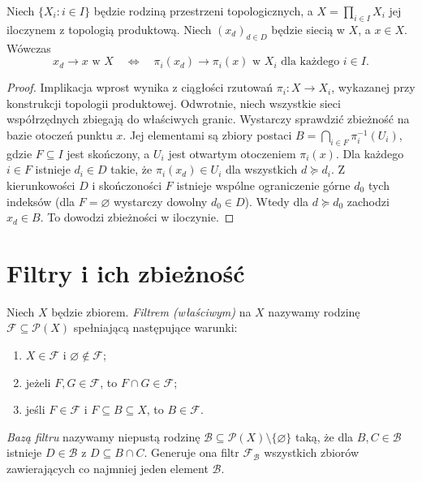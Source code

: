 \begin{twierdzenie}
\label{thm:topog-siec-iloczyn}
Niech $\{X_i:i\in I\}$ będzie rodziną przestrzeni
topologicznych, a $X=\prod_{i\in I}X_i$ jej iloczynem
z topologią produktową. Niech $(x_d)_{d\in D}$
będzie siecią w $X$, a $x\in X$. Wówczas
\[
 x_d\to x\text{ w }X
 \quad\Longleftrightarrow\quad
 \pi_i(x_d)\to\pi_i(x)\text{ w }X_i
 \text{ dla każdego }i\in I.
\]
\end{twierdzenie}
\begin{proof}
Implikacja wprost wynika z ciągłości rzutowań
$\pi_i\colon X\to X_i$, wykazanej przy konstrukcji
 topologii produktowej.
Odwrotnie, niech wszystkie sieci współrzędnych
zbiegają do właściwych granic. Wystarczy sprawdzić
zbieżność na bazie otoczeń punktu $x$.
Jej elementami są zbiory postaci
$B=\bigcap_{i\in F}\pi_i^{-1}(U_i)$,
gdzie $F\subseteq I$ jest skończony, a $U_i$
jest otwartym otoczeniem $\pi_i(x)$.
Dla każdego $i\in F$ istnieje $d_i\in D$ takie,
że $\pi_i(x_d)\in U_i$ dla wszystkich $d\succeq d_i$.
Z kierunkowości $D$ i skończoności $F$ istnieje
wspólne ograniczenie górne $d_0$ tych indeksów
(dla $F=\varnothing$ wystarczy dowolny $d_0\in D$).
Wtedy dla $d\succeq d_0$ zachodzi
$x_d\in B$. To dowodzi zbieżności w iloczynie.
\end{proof}

\section{Filtry i ich zbieżność}
\label{sec:topog-filtry}

\begin{definicja}
\label{def:topog-filtr}
Niech $X$ będzie zbiorem. \emph{Filtrem (właściwym)}
na $X$ nazywamy rodzinę $\mathcal F\subseteq\mathcal P(X)$
spełniającą następujące warunki:
\begin{enumerate}[label=(\roman*)]
\item $X\in\mathcal F$ i $\varnothing\notin\mathcal F$;
\item jeżeli $F,G\in\mathcal F$, to $F\cap G\in\mathcal F$;
\item jeśli $F\in\mathcal F$ i $F\subseteq B\subseteq X$,
      to $B\in\mathcal F$.
\end{enumerate}
\emph{Bazą filtru} nazywamy niepustą rodzinę
$\mathcal B\subseteq\mathcal P(X)\setminus\{\varnothing\}$
taką, że dla $B,C\in\mathcal B$ istnieje
$D\in\mathcal B$ z $D\subseteq B\cap C$.
Generuje ona filtr $\mathcal F_{\mathcal B}$ wszystkich
zbiorów zawierających co najmniej jeden element
$\mathcal B$.
\end{definicja}

